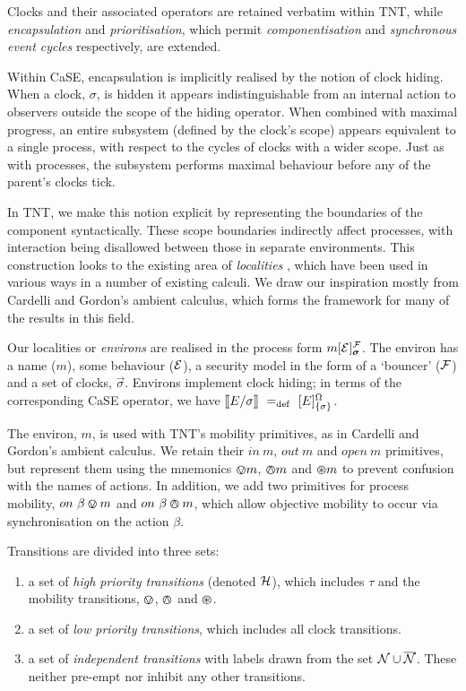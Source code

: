 \documentclass[orivec,envcountsame]{llncs}
\begin{document}
Clocks and their associated operators are retained verbatim within
TNT, while \emph{encapsulation} and \emph{prioritisation}, which permit
\emph{componentisation} and \emph{synchronous event cycles}
respectively, are extended.

Within CaSE, encapsulation is implicitly realised by the notion of clock
hiding.  When a clock, $\sigma$, is hidden it appears indistinguishable
from an internal action to observers outside the scope of the hiding
operator.  When combined with maximal progress, an entire subsystem
(defined by the clock's scope) appears equivalent to a single process,
with respect to the cycles of clocks with a wider scope.  Just as with
processes, the subsystem performs maximal behaviour before
any of the parent's clocks tick.

In TNT, we make this notion explicit by representing the boundaries of
the component syntactically.  These scope boundaries indirectly affect
processes, with interaction being disallowed between those in separate
environments.  This construction looks to the existing area of
\emph{localities} \cite{obslocal,pawl}, which have been used in various
ways in a number of existing calculi.  We draw our inspiration mostly
from Cardelli and Gordon's ambient calculus, which forms the framework
for many of the results in this field.

Our localities or \emph{environs} are realised in the process form
$\locv{m}{\expr}{\exprb}{\vec{\sigma}}$.  The environ has a name
($m$), some behaviour ($\text{$\mathcal{E}$}$), a security model in the form of a
`bouncer' ($\text{$\mathcal{F}$}$) and a set of clocks, $\vec{\sigma}$.  Environs implement clock hiding;
in terms of the corresponding CaSE operator, we have $[\hspace{-0.3ex}[ E / {\sigma} ]\hspace{-0.3ex}] \mathrel{~=_\mathrm{def}~} {}[ E ]^{\Omega}_{\{\sigma\}}$.

The environ, $m$, is used with TNT's mobility primitives, as in Cardelli
and Gordon's ambient calculus.  We retain their $in\ m$, $out\ m$ and $open\
m$ primitives, but represent them using the mnemonics $\varovee m$,
$\varowedge m$ and $\varoast m$ to prevent confusion with the names of
actions.  In addition, we add two primitives for process mobility,
$on\ \beta \varovee m$ and $on\ \beta \varowedge m$, which allow objective
mobility to occur via synchronisation on the action $\beta$.

Transitions are divided into three sets:

\begin{enumerate}
\item a set of \emph{high priority transitions} (denoted $\text{$\mathcal{H}$}$), which includes $\tau$ and
      the mobility transitions, $\varovee$, $\varowedge$ and $\varoast$.
\item a set of \emph{low priority transitions}, which includes all
      clock transitions.
\item a set of \emph{independent transitions} with labels drawn from the
      set $\text{$\mathcal{N}$} \cup \text{$\overline{\text{$\mathcal{N}$}}$}$. These neither pre-empt nor inhibit any other
      transitions.
\end{enumerate}
\end{document}
